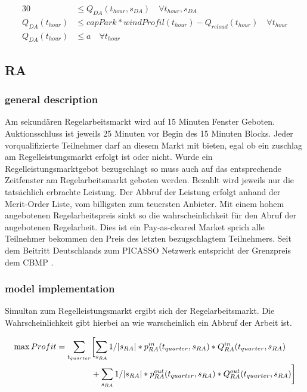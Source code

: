 \begin{alignat}{3}
	0                & \leq Q_{DA}(t_{hour}, s_{DA}) \quad\forall  t_{hour}, s_{DA}      \label{eq:DA_nonNeg}                 \\
	Q_{DA}(t_{hour}) & \leq capPark * windProfil(t_{hour}) - Q_{reload}(t_{hour}) \quad\forall t_{hour} \label{eq:DA_capPark} \\
	Q_{DA}(t_{hour}) & \leq a \quad\forall t_{hour} \label{eq:DA_a}
\end{alignat}

\subsection{RA}
\label{subsec:RA}
\subsubsection{general description}
Am sekundären Regelarbeitsmarkt wird auf 15 Minuten Fenster Geboten. Auktionsschluss ist jeweils 25 Minuten vor Begin des 15 Minuten Blocks.
Jeder vorqualifizierte Teilnehmer darf an diesem Markt mit bieten, egal ob ein zuschlag am Regelleistungsmarkt erfolgt ist oder nicht.
Wurde ein Regelleistungsmarktgebot bezugschlagt so muss auch auf das entsprechende Zeitfenster am Regelarbeitsmarkt geboten werden.
Bezahlt wird jeweils nur die tatsächlich erbrachte Leistung. Der Abbruf der Leistung erfolgt anhand der Merit-Order Liste, vom billigsten zum teuersten Anbieter.
Mit einem hohem angebotenen Regelarbeitspreis sinkt so die wahrscheinlichkeit für den Abruf der angebotenen Regelarbeit.
Dies ist ein Pay-as-cleared Market sprich alle Teilnehmer bekommen den Preis des letzten bezugschlagtem Teilnehmers.
Seit dem Beitritt Deutschlands zum PICASSO Netzwerk entspricht der Grenzpreis dem CBMP \cite{50hertzamprionTENNETTRANSNETBW.}.
\subsubsection{model implementation}
Simultan zum Regelleistungsmarkt ergibt sich der Regelarbeitsmarkt. Die Wahrscheinlichkeit gibt hierbei an wie warscheinlich ein Abbruf der Arbeit ist.


\begin{alignat}{3}
	\max Profit =  \sum_{t_{quarter}} & \biggl[ \sum_{s_{RA}}1/|s_{RA}| * p^{in}_{RA}(t_{quarter}, s_{RA}) * Q^{in}_{RA}(t_{quarter}, s_{RA})				\notag     \\
	                                  & + \sum_{s_{RA}}1/|s_{RA}| * p^{out}_{RA}(t_{quarter}, s_{RA}) * Q^{out}_{RA}(t_{quarter}, s_{RA}) \biggr]				\notag \\
\end{alignat}

